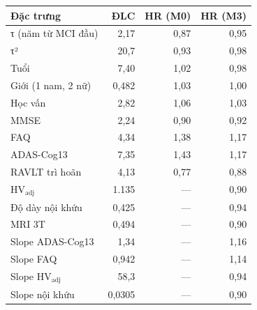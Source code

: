 \begin{tabular}{@{}lrrr@{}}
\toprule
Đặc trưng & ĐLC & HR (M0) & HR (M3)\\
\midrule
τ (năm từ MCI đầu) & 2,17 & 0,87 & 0,95\\
τ² & 20,7 & 0,93 & 0,98\\
Tuổi & 7,40 & 1,02 & 0,98\\
Giới (1 nam, 2 nữ) & 0,482 & 1,03 & 1,00\\
Học vấn & 2,82 & 1,06 & 1,03\\
MMSE & 2,24 & 0,90 & 0,92\\
FAQ & 4,34 & 1,38 & 1,17\\
ADAS-Cog13 & 7,35 & 1,43 & 1,17\\
RAVLT trì hoãn & 4,13 & 0,77 & 0,88\\
HV$_{\text{adj}}$ & 1.135 & — & 0,90\\
Độ dày nội khứu & 0,425 & — & 0,94\\
MRI 3T & 0,494 & — & 0,90\\
Slope ADAS-Cog13 & 1,34 & — & 1,16\\
Slope FAQ & 0,942 & — & 1,14\\
Slope HV$_{\text{adj}}$ & 58,3 & — & 0,94\\
Slope nội khứu & 0,0305 & — & 0,90\\
\bottomrule
\end{tabular}
